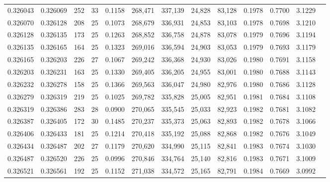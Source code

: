\begin{tabular}{rrrrrrrrrrrrr}
0.326043 & 0.326069 &   252 &  33 &                                     0.1158 & 268,471 & 337,139 &  24,828 &  83,128 & 0.1978 & 0.7700 & 3.1229 \\
0.326070 & 0.326128 &   208 &  25 &                                     0.1073 & 268,679 & 336,931 &  24,853 &  83,103 & 0.1978 & 0.7698 & 3.1210 \\
0.326128 & 0.326135 &   173 &  25 &                                     0.1263 & 268,852 & 336,758 &  24,878 &  83,078 & 0.1979 & 0.7696 & 3.1194 \\
0.326135 & 0.326165 &   164 &  25 &                                     0.1323 & 269,016 & 336,594 &  24,903 &  83,053 & 0.1979 & 0.7693 & 3.1179 \\
0.326165 & 0.326203 &   226 &  27 &                                     0.1067 & 269,242 & 336,368 &  24,930 &  83,026 & 0.1980 & 0.7691 & 3.1158 \\
0.326203 & 0.326231 &   163 &  25 &                                     0.1330 & 269,405 & 336,205 &  24,955 &  83,001 & 0.1980 & 0.7688 & 3.1143 \\
0.326232 & 0.326278 &   158 &  25 &                                     0.1366 & 269,563 & 336,047 &  24,980 &  82,976 & 0.1980 & 0.7686 & 3.1128 \\
0.326279 & 0.326319 &   219 &  25 &                                     0.1025 & 269,782 & 335,828 &  25,005 &  82,951 & 0.1981 & 0.7684 & 3.1108 \\
0.326319 & 0.326386 &   283 &  28 &                                     0.0900 & 270,065 & 335,545 &  25,033 &  82,923 & 0.1982 & 0.7681 & 3.1082 \\
0.326387 & 0.326405 &   172 &  30 &                                     0.1485 & 270,237 & 335,373 &  25,063 &  82,893 & 0.1982 & 0.7678 & 3.1066 \\
0.326406 & 0.326433 &   181 &  25 &                                     0.1214 & 270,418 & 335,192 &  25,088 &  82,868 & 0.1982 & 0.7676 & 3.1049 \\
0.326434 & 0.326487 &   202 &  27 &                                     0.1179 & 270,620 & 334,990 &  25,115 &  82,841 & 0.1983 & 0.7674 & 3.1030 \\
0.326487 & 0.326520 &   226 &  25 &                                     0.0996 & 270,846 & 334,764 &  25,140 &  82,816 & 0.1983 & 0.7671 & 3.1009 \\
0.326521 & 0.326561 &   192 &  25 &                                     0.1152 & 271,038 & 334,572 &  25,165 &  82,791 & 0.1984 & 0.7669 & 3.0992 \\

\end{tabular}
